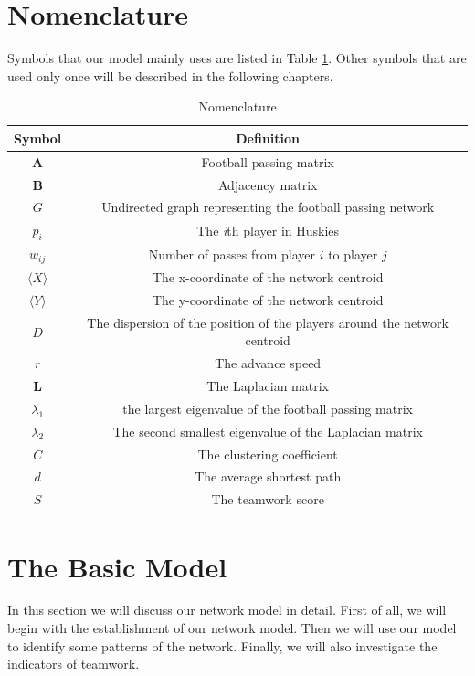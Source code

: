 \documentclass{mcmthesis}
\begin{document}
\section{Nomenclature}
	Symbols that our model mainly uses are listed in Table \ref{tab:Nomen}.  Other symbols that are used only once will be described in the following chapters.
	\begin{table}
    	\centering
    	\caption{Nomenclature}
		\label{tab:Nomen}
		\begin{tabular}{c c}
			\hline	
				Symbol & Definition\\
			\hline
				$\textbf{A}$ & Football passing matrix\\
				$\textbf{B}$ & Adjacency matrix\\
				$G$ & Undirected graph representing the football passing network\\
				$p_{i}$ & The \emph{i}th player in Huskies\\
				$w_{ij}$ & Number of passes from player $i$ to player $j$\\
				$\langle$$X$$\rangle$ & The x-coordinate of the network centroid\\
				$\langle$$Y$$\rangle$ & The y-coordinate of the network centroid\\
				$D$ & The dispersion of the position of the players around the network centroid\\
				$r$ & The advance speed\\
				$\textbf{L}$ & The Laplacian matrix\\
				$\lambda_{1}$ & the largest eigenvalue of the football passing matrix\\
				$\lambda_{2}$ & The second smallest eigenvalue of the Laplacian matrix\\
				$C$ & The clustering coefficient\\
				$d$ & The average shortest path\\
				$S$ & The teamwork score\\
			\hline
   	 	\end{tabular}
	\end{table}

\section{The Basic Model}
	In this section we will discuss our network model in detail.  First of all, we will begin with the establishment of our network model.  Then we will use our model to identify some patterns of the network.  Finally, we will also investigate the indicators of teamwork. 
\end{document}
